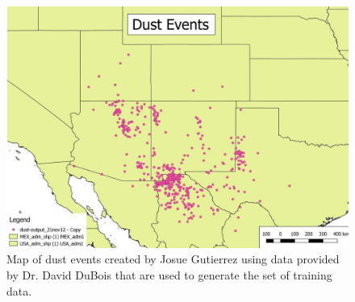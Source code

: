 \documentclass{article}
\begin{document}
\begin{figure}[H]
	\label{fig:events}
	\includegraphics[width=\textwidth]{images/dustevents.jpg}
	\caption{Map of dust events created by Josue Gutierrez using data provided by Dr. David DuBois that are used to generate the set of training data.}
\end{figure}
\end{document}

